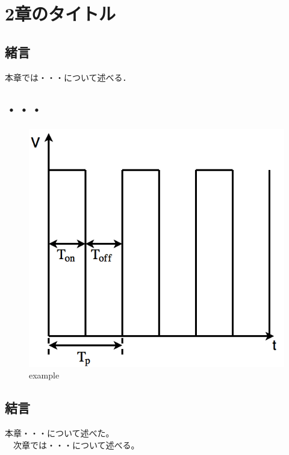
\chapter{2章のタイトル}
\label{chap:second}


\section{緒言}
本章では・・・について述べる．

\section{・・・}

\begin{figure}[!ht]
    \begin{center}
        \includegraphics[scale = 0.2]{sotu/figure/pwmduty.png}
        \caption{example}
        \label{example}
    \end{center}
	\end{figure}



\section{結言}
本章・・・について述べた。\\
　次章では・・・について述べる。







